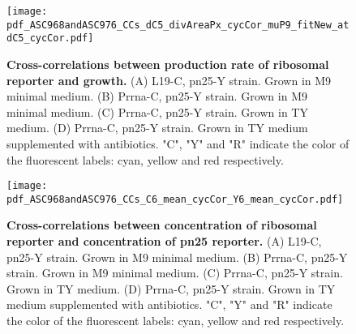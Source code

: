 \begin{figure}
    \centering
    \texttt{[image: pdf\_ASC968andASC976\_CCs\_dC5\_divAreaPx\_cycCor\_muP9\_fitNew\_atdC5\_cycCor.pdf]}
    \caption{ 
        \textbf{Cross-correlations between production rate of ribosomal reporter and growth.}
        (A) L19-C, pn25-Y strain. Grown in M9 minimal medium.
        (B) Prrna-C, pn25-Y strain. Grown in M9 minimal medium.
        (C) Prrna-C, pn25-Y strain. Grown in TY medium.
        (D) Prrna-C, pn25-Y strain. Grown in TY medium supplemented with antibiotics.
        "C", "Y" and "R" indicate the color of the fluorescent labels: cyan, yellow and red respectively.
    }
    \label{fig:ribo:CCsPmuYRibo}
\end{figure}



\begin{figure}
    \centering
    \texttt{[image: pdf\_ASC968andASC976\_CCs\_C6\_mean\_cycCor\_Y6\_mean\_cycCor.pdf]}
    \caption{ 
        \textbf{Cross-correlations between concentration of ribosomal reporter and concentration of pn25 reporter.}
        (A) L19-C, pn25-Y strain. Grown in M9 minimal medium.
        (B) Prrna-C, pn25-Y strain. Grown in M9 minimal medium.
        (C) Prrna-C, pn25-Y strain. Grown in TY medium.
        (D) Prrna-C, pn25-Y strain. Grown in TY medium supplemented with antibiotics.
        "C", "Y" and "R" indicate the color of the fluorescent labels: cyan, yellow and red respectively.
    }
    \label{fig:ribo:CCsEERiboPn25}
\end{figure}

